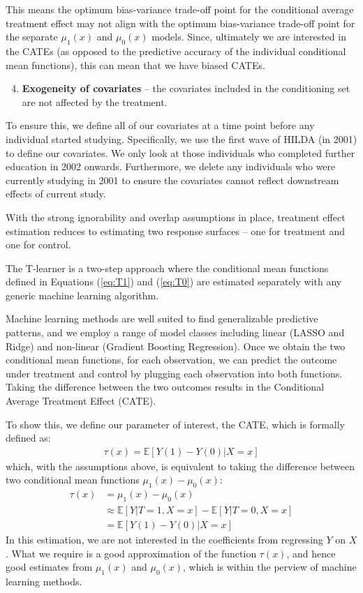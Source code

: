 \documentclass[12pt, a4paper]{article}
\begin{document}
This means the optimum bias-variance trade-off point for the conditional
average treatment effect may not align with the optimum bias-variance trade-off
point for the separate $\mu_1(x)$ and $\mu_0(x)$ models. Since, ultimately we
are interested in the CATEs (as opposed to the predictive accuracy of the
individual conditional mean functions), this can mean that we have biased
CATEs.

\begin{enumerate}
  \setcounter{enumi}{3}
  \item \textbf{Exogeneity of covariates} -- the covariates included in the conditioning set are not affected by the treatment. 
\end{enumerate}

To ensure this, we define all of our covariates at a time point before any
individual started studying. Specifically, we use the first wave of HILDA (in
2001) to define our covariates. We only look at those individuals who completed
further education in 2002 onwards. Furthermore, we delete any individuals who
were currently studying in 2001 to ensure the covariates cannot reflect
downstream effects of current study. 

With the strong ignorability and overlap assumptions in place, treatment effect estimation reduces to estimating two response surfaces – one for treatment and one for control.

The T-learner is a two-step approach where the conditional mean functions defined in Equations (\ref{eq:T1}) and (\ref{eq:T0}) are estimated separately with any generic machine learning algorithm.

Machine learning methods are well suited to find generalizable predictive patterns, and we employ a range of model classes including linear (LASSO and Ridge) and non-linear (Gradient Boosting Regression). Once we obtain the two conditional mean functions, for each observation, we can predict the outcome under treatment and control by plugging each observation into both functions. Taking the difference between the two outcomes results in the Conditional Average Treatment Effect (CATE).

To show this, we define our parameter of interest, the CATE, which is formally defined as:
\begin{align}
\tau (x) = \mathbb{E}[Y(1) - Y(0) | X = x]
\end{align}
which, with the assumptions above, is equivalent to taking the difference between two conditional mean functions $\mu _1(x) - \mu _0(x)$:
\begin{align*}
\tau (x) & = \mu _1(x) - \mu _0(x) \\
& \approx \mathbb{E}[Y | T = 1, X = x] - \mathbb{E}[Y | T = 0, X = x] \\
& = \mathbb{E}[Y(1) - Y(0) | X = x]
\end{align*}
In this estimation, we are not interested in the coefficients from regressing
$Y$ on $X$. What we require is a good approximation of the function $\tau(x)$,
and hence good estimates from $\mu_1(x)$ and $\mu_0(x)$, which is within the
perview of machine learning methods.
\end{document}
